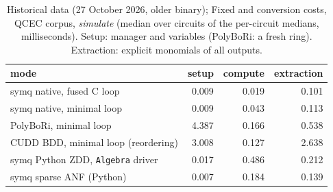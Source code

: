 \begin{table}[t]
\centering\small
\caption{Historical data (27 October 2026, older binary); Fixed and conversion costs, QCEC corpus, \emph{simulate} (median over circuits of the per-circuit medians, milliseconds). Setup: manager and variables (PolyBoRi: a fresh ring). Extraction: explicit monomials of all outputs.}
\label{tab:setup}
\begin{tabular}{lrrr}
\toprule
mode & setup & compute & extraction \\
\midrule
symq native, fused C loop & 0.009 & 0.019 & 0.101 \\
symq native, minimal loop & 0.009 & 0.043 & 0.113 \\
PolyBoRi, minimal loop & 4.387 & 0.166 & 0.538 \\
CUDD BDD, minimal loop (reordering) & 3.008 & 0.127 & 2.638 \\
symq Python ZDD, \texttt{Algebra} driver & 0.017 & 0.486 & 0.212 \\
symq sparse ANF (Python) & 0.007 & 0.184 & 0.139 \\
\bottomrule
\end{tabular}
\end{table}

